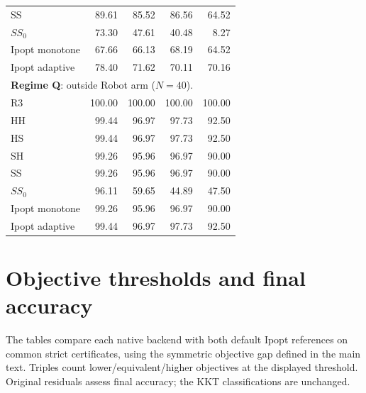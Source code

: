 \documentclass[pdflatex,sn-mathphys-num]{sn-jnl}
\theoremstyle{thmstyleone}
\theoremstyle{thmstylethree}
\newenvironment{scaledtable}[1][tbp]{\begin{tableorg}[#1]\centering}{\end{tableorg}}
\begin{document}
\begin{scaledtable}[!htbp]
{\begin{tabular}{@{}lrrrr@{}}
SS & 89.61 & 85.52 & 86.56 & 64.52 \\
$SS_0$ & 73.30 & 47.61 & 40.48 & 8.27 \\
Ipopt monotone & 67.66 & 66.13 & 68.19 & 64.52 \\
Ipopt adaptive & 78.40 & 71.62 & 70.11 & 70.16 \\
\midrule
\multicolumn{5}{l}{\textbf{Regime Q}: outside Robot arm ($N=40$).} \\
R3 & 100.00 & 100.00 & 100.00 & 100.00 \\
HH & 99.44 & 96.97 & 97.73 & 92.50 \\
HS & 99.44 & 96.97 & 97.73 & 92.50 \\
SH & 99.26 & 95.96 & 96.97 & 90.00 \\
SS & 99.26 & 95.96 & 96.97 & 90.00 \\
$SS_0$ & 96.11 & 59.65 & 44.89 & 47.50 \\
Ipopt monotone & 99.26 & 95.96 & 96.97 & 90.00 \\
Ipopt adaptive & 99.44 & 96.97 & 97.73 & 92.50 \\
\bottomrule
\end{tabular}

}
\end{scaledtable}


\FloatBarrier
\section{Objective thresholds and final accuracy}\label{app:objective-accuracy}
The tables compare each native backend with both default Ipopt references
on common strict certificates, using the symmetric objective gap defined
in the main text. Triples count lower/equivalent/higher objectives at the
displayed threshold. Original residuals assess final accuracy; the KKT
classifications are unchanged.
\end{document}

